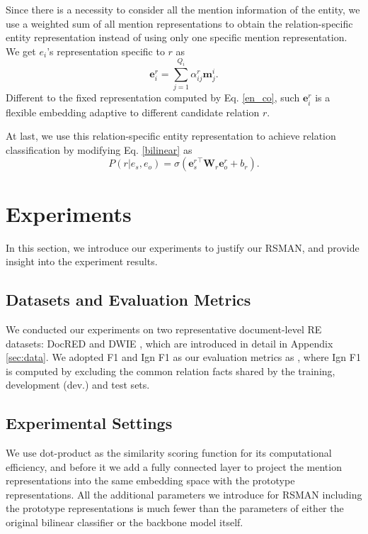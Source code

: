\documentclass[11pt]{article}
\begin{document}
Since there is a necessity to consider all the mention information of the entity, we  use a weighted sum of all mention representations to obtain the relation-specific entity representation instead of using only one specific mention representation. We get $e_i$'s representation specific to $r$ as
\begin{equation}
   \boldsymbol{e}_i^r = \sum_{j=1}^{Q_i}{\alpha}^{r}_{ij}\boldsymbol{m}^i_j.
\end{equation}
Different to the fixed representation computed by Eq. \ref{en_co}, such $\boldsymbol{e}_i^r$ is a flexible embedding adaptive to different candidate relation $r$.

At last, we use this relation-specific entity representation to achieve relation classification by modifying Eq. \ref{bilinear} as
\begin{equation}
   P(r|{e}_{s},{e}_{o}) = \sigma({\boldsymbol{e}_{s}^{r}}^\top \boldsymbol{W}_r \boldsymbol{e}_{o}^{r}+b_r).
\end{equation}


\section{Experiments}
In this section, we introduce our experiments to justify our RSMAN, and provide insight into the experiment results.

\subsection{Datasets and Evaluation Metrics}
We conducted our experiments on two representative document-level RE datasets: DocRED \cite{yao-etal-2019-docred} and DWIE \cite{zaporojets2021dwie}, which are introduced in detail in Appendix \ref{sec:data}. We adopted F1 and Ign F1 as our evaluation metrics as \cite{yao-etal-2019-docred}, where Ign F1 is computed by excluding the common relation facts shared by the training, development (dev.) and test sets.

\subsection{Experimental Settings}
We use dot-product as the similarity scoring function for its computational efficiency, and before it we add a fully
connected layer to project the mention representations into the same embedding space with the prototype representations. All the additional parameters we introduce for RSMAN including the prototype representations is much fewer than the parameters of either the original bilinear classifier or the backbone model itself.
\end{document}

